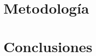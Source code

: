 \documentclass{article}
\begin{document}
  \section*{Metodología}

  \section*{Conclusiones}

  \renewcommand{\refname}{Referencias}
  
  
\end{document}
